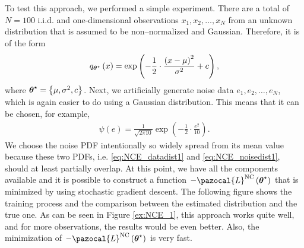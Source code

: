 \begin{example}
To test this approach, we performed a simple experiment. There are a total of $N = 100$ i.i.d. and one-dimensional observations $x_1,x_2,\dots,x_N$ from an unknown distribution that is assumed to be non--normalized and Gaussian. Therefore, it is of the form
\begin{align}\label{eq:NCE_datadist1}
    q_{\boldsymbol{\theta}^\star}\left(x\right) = \exp\left(-\frac{1}{2}\cdot\frac{\left(x-\mu\right)^2}{\sigma^2} + c \right),
\end{align} 
where $\boldsymbol{\theta}^\star = \left\lbrace \mu, \sigma^2, c \right\rbrace$. Next, we artificially generate noise data $e_1,e_2,\dots,e_N$, which is again easier to do using a Gaussian distribution. This means that it can be chosen, for example,
\begin{align}\label{eq:NCE_noisedist1}
    \psi\left(e\right) = \frac{1}{\sqrt{2\pi 10}}\exp\left(-\frac{1}{2}\cdot\frac{e^2}{10} \right).
\end{align}
We choose the noise PDF intentionally so widely spread from its mean value because these two PDFs, i.e. \eqref{eq:NCE_datadist1} and \eqref{eq:NCE_noisedist1}, should at least partially overlap. At this point, we have all the components available and it is possible to construct a function $-\pazocal{L}^{\mathrm{NC}}\left(\bt^\star\right)$ that is minimized by using stochastic gradient descent. The following figure shows the training process and the comparison between
the estimated distribution and the true one. As can be seen in Figure \ref{ex:NCE_1}, this approach works quite well, and for more observations, the results would be even better. Also, the minimization of $-\pazocal{L}^{\mathrm{NC}}\left(\bt^\star\right)$ is very fast.
\begin{figure}[h]
	\centering

\end{figure}
\end{example}

